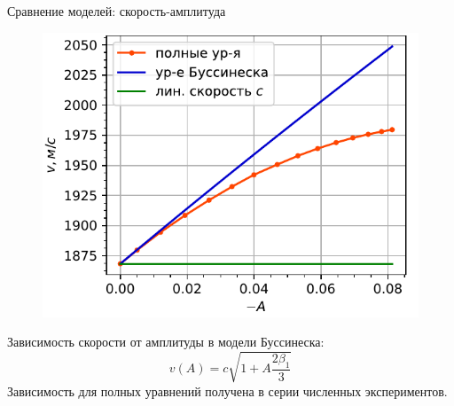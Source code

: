 \documentclass[usenames,dvipsnames]{beamer}
\DeclareMathOperator{\erf}{erf}
\newcommand{\lb}{\left (}
\newcommand{\rb}{\right )}
\newcommand{\pdiff}[2]{\frac{\partial #1}{\partial #2}}
\begin{document}
\begin{frame}{Сравнение моделей: скорость-амплитуда}
\begin{figure}
	\includegraphics[width=\linewidth]{Figures/VelAmplColor}
\end{figure}
Зависимость скорости от амплитуды в модели Буссинеска:
\begin{equation}\nonumber
v(A) = c\sqrt{1 + A\frac{2\beta_1}{3}}
\end{equation}
Зависимость для полных уравнений получена в серии численных экспериментов.\\
\end{frame}
\end{document}
